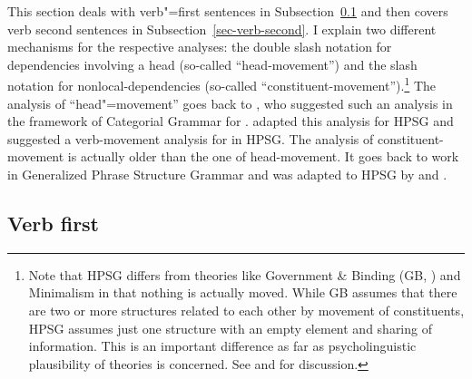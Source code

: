 This section deals with verb"=first sentences in Subsection~\ref{sec-verb-first} and then covers verb
second sentences in Subsection~\ref{sec-verb-second}. I explain two different mechanisms for the
respective analyses: the double slash notation for dependencies involving a head (so-called ``head-movement'') and the slash notation
for nonlocal-dependencies (so-called ``constituent-movement'').\footnote{
  Note that HPSG differs from theories like Government \& Binding (GB, \citealt{Chomsky81a}) and
  Minimalism \citep{Chomsky95a-u} in that nothing is
  actually moved. While GB assumes that there are two or more structures related to each other by
  movement of constituents, HPSG assumes just one structure with an empty element and sharing of
  information. This is an important difference as far as psycholinguistic plausibility of theories
  is concerned. See  and  for discussion.
}
The analysis of ``head"=movement'' goes back to \citet{Jacobson87}, who suggested such an analysis
in the framework of Categorial Grammar for . \citet{Borsley89} adapted this analysis for HPSG
and \citet{KW91a,Kiss95a,Kiss95b} suggested a verb-movement analysis for  in HPSG. The analysis of
constituent-movement is actually older than the one of head-movement. It goes back to work in
Generalized Phrase Structure Grammar \citep{Gazdar81a} and was adapted to HPSG by \citet[Section~3.4]{ps} and \citet[Chapter~4]{ps2}. 

\subsection{Verb first}
\label{sec-verb-first}

